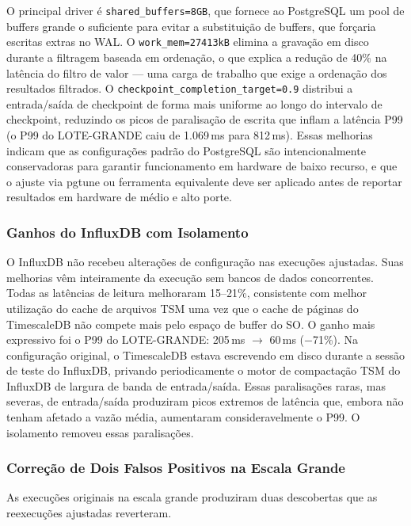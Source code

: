 O principal driver é \texttt{shared\_buffers=8GB}, que fornece ao PostgreSQL um pool de buffers grande o suficiente para evitar a substituição de buffers, que forçaria escritas extras no WAL.
O \texttt{work\_mem=27413kB} elimina a gravação em disco durante a filtragem baseada em ordenação, o que explica a redução de 40\% na latência do filtro de valor — uma carga de trabalho que exige a ordenação dos resultados filtrados. O
\texttt{checkpoint\_completion\_target=0.9} distribui a entrada/saída de checkpoint de forma mais
uniforme ao longo do intervalo de checkpoint, reduzindo os picos de paralisação de escrita
que inflam a latência P99 (o P99 do LOTE-GRANDE caiu de 1.069\,ms para 812\,ms). Essas
melhorias indicam que as configurações padrão do PostgreSQL são intencionalmente conservadoras
para garantir funcionamento em hardware de baixo recurso, e que o ajuste via pgtune ou
ferramenta equivalente deve ser aplicado antes de reportar resultados em hardware de médio e
alto porte.

\subsubsection{Ganhos do InfluxDB com Isolamento}

O InfluxDB não recebeu alterações de configuração nas execuções ajustadas. Suas melhorias vêm inteiramente da execução sem bancos de dados concorrentes. Todas as latências de leitura
melhoraram 15--21\%, consistente com melhor utilização do cache de arquivos TSM uma vez que
o cache de páginas do TimescaleDB não compete mais pelo espaço de buffer do SO. O ganho mais expressivo foi o P99 do LOTE-GRANDE: 205\,ms $\to$ 60\,ms ($-$71\%). Na configuração
original, o TimescaleDB estava escrevendo em disco durante a sessão de teste
do InfluxDB, privando periodicamente o motor de compactação TSM do InfluxDB de largura de
banda de entrada/saída. Essas paralisações raras, mas severas, de entrada/saída produziram picos extremos de latência que, embora não tenham afetado a vazão média, aumentaram consideravelmente o P99. O isolamento
removeu essas paralisações.

\subsubsection{Correção de Dois Falsos Positivos na Escala Grande}

As execuções originais na escala grande produziram duas descobertas que as reexecuções
ajustadas reverteram.

